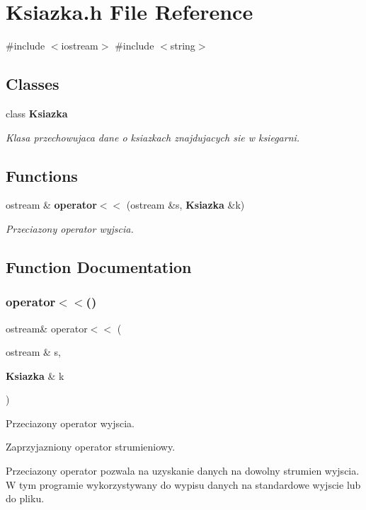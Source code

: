 \section{Ksiazka.\+h File Reference}
\label{_ksiazka_8h}
{\ttfamily \#include $<$iostream$>$}\newline
{\ttfamily \#include $<$string$>$}\newline
\subsection*{Classes}
\begin{DoxyCompactItemize}
\item 
class \textbf{ Ksiazka}
\begin{DoxyCompactList}\small\item\em Klasa przechowujaca dane o ksiazkach znajdujacych sie w ksiegarni. \end{DoxyCompactList}\end{DoxyCompactItemize}
\subsection*{Functions}
\begin{DoxyCompactItemize}
\item 
ostream \& \textbf{ operator$<$$<$} (ostream \&s, \textbf{ Ksiazka} \&k)
\begin{DoxyCompactList}\small\item\em Przeciazony operator wyjscia. \end{DoxyCompactList}\end{DoxyCompactItemize}


\subsection{Function Documentation}
\mbox{\label{_ksiazka_8h_a6304f50ce62c067a686efe441f71c54d}} 
\subsubsection{operator$<$$<$()}
{\footnotesize\ttfamily ostream\& operator$<$$<$ (\begin{DoxyParamCaption}\item[{ostream \&}]{s,  }\item[{\textbf{ Ksiazka} \&}]{k }\end{DoxyParamCaption})}



Przeciazony operator wyjscia. 

Zaprzyjazniony operator strumieniowy.

Przeciazony operator pozwala na uzyskanie danych na dowolny strumien wyjscia. W tym programie wykorzystywany do wypisu danych na standardowe wyjscie lub do pliku. 